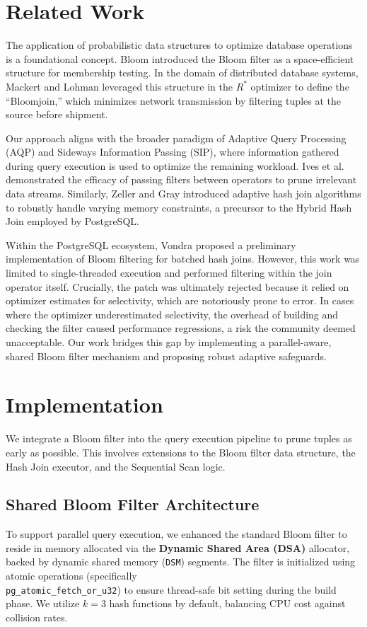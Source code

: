 \documentclass[sigconf,nonacm]{acmart}
\begin{document}
\section{Related Work}
The application of probabilistic data structures to optimize database operations is a foundational concept. Bloom \cite{bloom1970space} introduced the Bloom filter as a space-efficient structure for membership testing. In the domain of distributed database systems, Mackert and Lohman \cite{mackert1986r_optimizer} leveraged this structure in the $R^*$ optimizer to define the ``Bloomjoin,'' which minimizes network transmission by filtering tuples at the source before shipment.

Our approach aligns with the broader paradigm of Adaptive Query Processing (AQP) and Sideways Information Passing (SIP), where information gathered during query execution is used to optimize the remaining workload. Ives et al. \cite{ives2009adaptive} demonstrated the efficacy of passing filters between operators to prune irrelevant data streams. Similarly, Zeller and Gray \cite{zeller1990adaptive} introduced adaptive hash join algorithms to robustly handle varying memory constraints, a precursor to the Hybrid Hash Join employed by PostgreSQL.

Within the PostgreSQL ecosystem, Vondra \cite{vondra2015bloomhashbatches} proposed a preliminary implementation of Bloom filtering for batched hash joins. However, this work was limited to single-threaded execution and performed filtering within the join operator itself. Crucially, the patch was ultimately rejected because it relied on optimizer estimates for selectivity, which are notoriously prone to error. In cases where the optimizer underestimated selectivity, the overhead of building and checking the filter caused performance regressions, a risk the community deemed unacceptable. Our work bridges this gap by implementing a parallel-aware, shared Bloom filter mechanism and proposing robust adaptive safeguards.

\section{Implementation}

We integrate a Bloom filter into the query execution pipeline to prune tuples as early as possible. This involves extensions to the Bloom filter data structure, the Hash Join executor, and the Sequential Scan logic.

\subsection{Shared Bloom Filter Architecture}
To support parallel query execution, we enhanced the standard Bloom filter to reside in memory allocated via the \textbf{Dynamic Shared Area (DSA)} allocator, backed by dynamic shared memory (\texttt{DSM}) segments. The filter is initialized using atomic operations (specifically \\ \texttt{pg\_atomic\_fetch\_or\_u32}) to ensure thread-safe bit setting during the build phase. We utilize $k=3$ hash functions by default, balancing CPU cost against collision rates.
\end{document}
